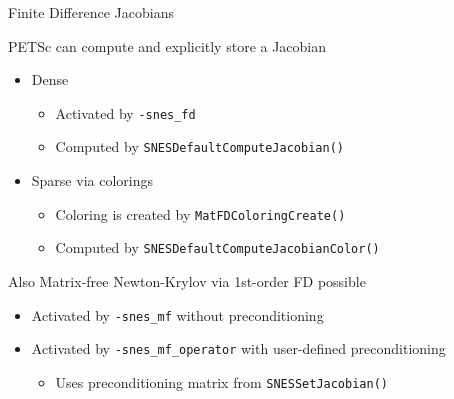 \begin{frame}[fragile]{Finite Difference Jacobians}

\begin{block}{PETSc can compute and explicitly store a Jacobian}
 
 \begin{itemize}
  \item Dense
    \begin{itemize}
    \item Activated by \lstinline|-snes_fd|
    \item Computed by \lstinline|SNESDefaultComputeJacobian()|
    \end{itemize}
  \item Sparse via colorings
    \begin{itemize}
    \item Coloring is created by \lstinline|MatFDColoringCreate()|
    \item Computed by \lstinline|SNESDefaultComputeJacobianColor()|
    \end{itemize}
  \end{itemize}
  
\end{block}

  \begin{block}{Also Matrix-free Newton-Krylov via 1st-order FD possible}
  \begin{itemize}
  \item Activated by \lstinline|-snes_mf| without preconditioning
  \item Activated by \lstinline|-snes_mf_operator| with user-defined preconditioning
    \begin{itemize}
    \item Uses preconditioning matrix from \lstinline|SNESSetJacobian()|
    \end{itemize}
  \end{itemize}
  \end{block}

\end{frame}
